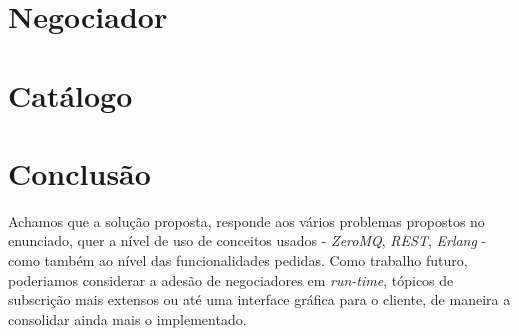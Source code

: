 \documentclass[12pt, a4paper]{report}
\begin{document}
 
\chapter{Negociador}

\chapter{Catálogo}

\chapter{Conclusão}

Achamos que a solução proposta, responde aos vários problemas propostos no
enunciado, quer a nível de uso de conceitos usados - \textit{ZeroMQ},
\textit{REST}, \textit{Erlang} - como também ao nível das funcionalidades
pedidas.
Como trabalho futuro, poderiamos considerar a adesão de negociadores em
\textit{run-time}, tópicos de subscrição mais extensos ou até uma interface
gráfica para o cliente, de maneira a consolidar ainda mais o implementado.
\end{document}

